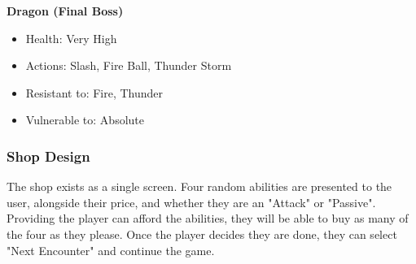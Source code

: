 \textbf{Dragon (Final Boss)}
\begin{itemize}
\item Health: Very High
\item Actions: Slash, Fire Ball, Thunder Storm
\item Resistant to: Fire, Thunder
\item Vulnerable to: Absolute
\end{itemize}

\subsubsection{Shop Design}

The shop exists as a single screen. Four random abilities are presented to the user, alongside their price, and whether they are an "Attack" or "Passive". Providing the player can afford the abilities, they will be able to buy as many of the four as they please. Once the player decides they are done, they can select "Next Encounter" and continue the game.
